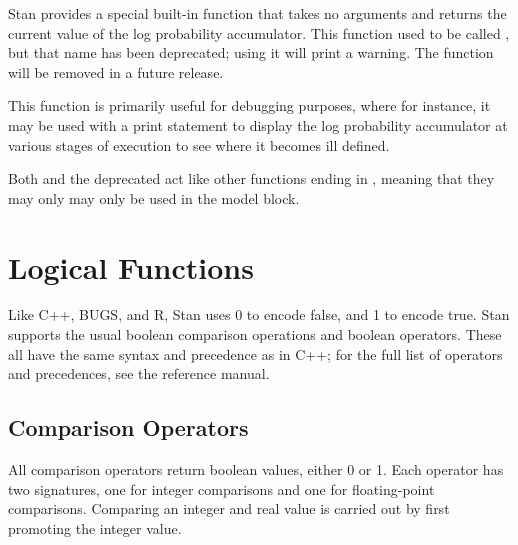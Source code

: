 \begin{description}
\begin{description}
\begin{description}
\begin{description}
\begin{description}
\begin{description}
Stan provides a special built-in function  that takes no arguments and returns the current value of the log probability accumulator. This function used to be called , but that   name has been deprecated; using it will print a warning.  The   function  will be removed in a future release.

This function is primarily useful for debugging purposes, where for instance, it may be used with a print statement to display the log probability accumulator at various stages of execution to see where it becomes ill defined.

\begin{description}       \end{description}

 Both  and the deprecated  act like other functions ending in , meaning that they may only may only be used in the model block.

\section{Logical Functions}

Like C++, BUGS, and R, Stan uses 0 to encode false, and 1 to encode true.  Stan supports the usual boolean comparison operations and boolean operators.  These all have the same syntax and precedence as in C++; for the full list of operators and precedences, see the reference manual.

\subsection{Comparison Operators}

All comparison operators return boolean values, either 0 or 1.  Each operator has two signatures, one for integer comparisons and one for floating-point comparisons.  Comparing an integer and real value is carried out by first promoting the integer value.


\end{description}
\end{description}
\end{description}
\end{description}
\end{description}
\end{description}
